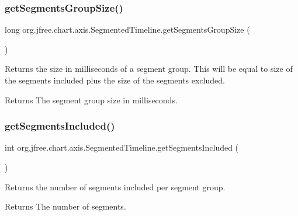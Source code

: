 \subsubsection{\texorpdfstring{get\+Segments\+Group\+Size()}{getSegmentsGroupSize()}}
{\footnotesize\ttfamily long org.\+jfree.\+chart.\+axis.\+Segmented\+Timeline.\+get\+Segments\+Group\+Size (\begin{DoxyParamCaption}{ }\end{DoxyParamCaption})}

Returns the size in milliseconds of a segment group. This will be equal to size of the segments included plus the size of the segments excluded.

\begin{DoxyReturn}{Returns}
The segment group size in milliseconds. 
\end{DoxyReturn}
\mbox{\label{classorg_1_1jfree_1_1chart_1_1axis_1_1_segmented_timeline_abea5687d00b14c38d6b99a71443c31e6}} 
\subsubsection{\texorpdfstring{get\+Segments\+Included()}{getSegmentsIncluded()}}
{\footnotesize\ttfamily int org.\+jfree.\+chart.\+axis.\+Segmented\+Timeline.\+get\+Segments\+Included (\begin{DoxyParamCaption}{ }\end{DoxyParamCaption})}

Returns the number of segments included per segment group.

\begin{DoxyReturn}{Returns}
The number of segments. 
\end{DoxyReturn}
\mbox{\label{classorg_1_1jfree_1_1chart_1_1axis_1_1_segmented_timeline_a5718aa9974ca6e82c0243a847b2e6286}} 
